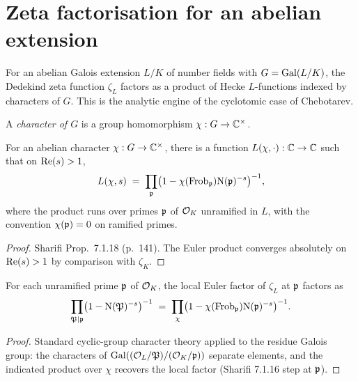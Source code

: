 \section{Zeta factorisation for an abelian extension}

For an abelian Galois extension $L/K$ of number fields with
$G=\mathrm{Gal}(L/K)$, the Dedekind zeta function $\zeta_L$ factors as a
product of Hecke $L$-functions indexed by characters of $G$. This is
the analytic engine of the cyclotomic case of Chebotarev.

\begin{definition}\label{def:galois-character}
  \leanok
  A \emph{character of $G$} is a group homomorphism
  $\chi: G \to \mathbb{C}^\times$.
\end{definition}

\begin{lemma}\label{lem:artin-euler-product-abelian}
  For an abelian character $\chi: G \to \mathbb{C}^\times$, there is a function
  $L(\chi, \cdot): \mathbb{C} \to \mathbb{C}$ such that on $\operatorname{Re}(s) > 1$,
  \[
    L(\chi, s) \;=\; \prod_{\mathfrak{p}} \bigl(1-\chi(\mathrm{Frob}_{\mathfrak{p}}) \mathrm{N}(\mathfrak{p})^{-s}\bigr)^{-1},
  \]
  where the product runs over primes $\mathfrak{p}$ of $\mathcal{O}_K$ unramified in $L$,
  with the convention $\chi(\mathfrak{p}) = 0$ on ramified primes.
\end{lemma}

\begin{proof}
  Sharifi Prop.~7.1.18 (p.~141). The Euler product converges
  absolutely on $\operatorname{Re}(s) > 1$ by comparison with $\zeta_K$.
\end{proof}

\begin{lemma}\label{lem:dedekind-local-factor}
  For each unramified prime $\mathfrak{p}$ of $\mathcal{O}_K$, the local Euler factor of
  $\zeta_L$ at $\mathfrak{p}$ factors as
  \[
    \prod_{\mathfrak{P}\mid\mathfrak{p}}\bigl(1-\mathrm{N}(\mathfrak{P})^{-s}\bigr)^{-1}
    \;=\; \prod_\chi \bigl(1-\chi(\mathrm{Frob}_{\mathfrak{p}})\mathrm{N}(\mathfrak{p})^{-s}\bigr)^{-1}.
  \]
\end{lemma}

\begin{proof}
  Standard cyclic-group character theory applied to the residue Galois
  group: the characters of $\mathrm{Gal}((\mathcal{O}_L/\mathfrak{P})/(\mathcal{O}_K/\mathfrak{p}))$ separate
  elements, and the indicated product over $\chi$ recovers the local
  factor (Sharifi 7.1.16 step at $\mathfrak{p}$).
\end{proof}

